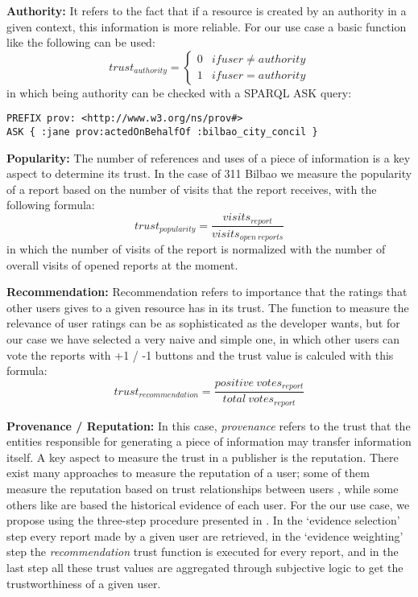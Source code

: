 \textbf{Authority:} It refers to the fact that if a resource is created by an authority in a given context, this information is more reliable. For our use case a basic function like the following can be used:
%
\begin{equation}
	trust_{authority} = \left\{\begin{matrix}
	0 & if user \neq authority \\
	1 & if user = authority
	\end{matrix}\right.
\end{equation}
%
in which being authority can be checked with a SPARQL ASK query:
%
\lstset{numbers=left, basicstyle=\ttfamily\scriptsize,}
\begin{lstlisting}
PREFIX prov: <http://www.w3.org/ns/prov#>
ASK { :jane prov:actedOnBehalfOf :bilbao_city_concil }
\end{lstlisting}
%

\textbf{Popularity:} The number of references and uses of a piece of information is a key aspect to determine its trust. In the case of 311 Bilbao we measure the popularity of a report based on the number of visits that the report receives, with the following formula:
%
\begin{equation}
    trust_{popularity} = \frac{visits_{report}}{visits_{open\ reports}}
\end{equation}
%
in which the number of visits of the report is normalized with the number of overall visits of opened reports at the moment.

\textbf{Recommendation:} Recommendation refers to importance that the ratings that other users gives to a given resource has in its trust. The function to measure the relevance of user ratings can be as sophisticated as the developer wants, but for our case we have selected a very naive and simple one, in which other users can vote the reports with +1 / -1 buttons and the trust value is calculed with this formula:
%
\begin{equation}
    trust_{recommendation} = \frac{positive\ votes_{report}}{total\ votes_{report}}
\end{equation}
%

\textbf{Provenance / Reputation:} In this case, \textit{provenance} refers to the trust that the entities responsible for generating a piece of information may transfer information itself. A key aspect to measure the trust in a publisher is the reputation. There exist many approaches to measure the reputation of a user; some of them measure the reputation based on trust relationships between users \cite{golbeck2006combining}, while some others like \cite{CeolinGHNF12} are based the historical evidence of each user. For the our use case, we propose using the three-step procedure presented in \cite{CeolinGHNF12}. In the `evidence selection' step every report made by a given user are retrieved, in the `evidence weighting' step the \textit{recommendation} trust function is executed for every report, and in the last step all these trust values are aggregated through subjective logic to get the trustworthiness of a given user.

